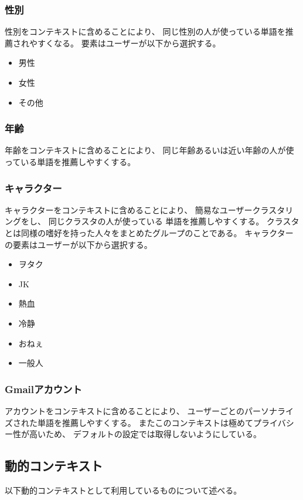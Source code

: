 \subsubsection{性別}
性別をコンテキストに含めることにより、
同じ性別の人が使っている単語を推薦されやすくなる。
要素はユーザーが以下から選択する。
\begin{itemize}
  \item 男性
  \item 女性
  \item その他
\end{itemize}

\subsubsection{年齢}
年齢をコンテキストに含めることにより、
同じ年齢あるいは近い年齢の人が使っている単語を推薦しやすくする。

\subsubsection{キャラクター}
キャラクターをコンテキストに含めることにより、
簡易なユーザークラスタリングをし、
同じクラスタの人が使っている
単語を推薦しやすくする。
クラスタとは同様の嗜好を持った人々をまとめたグループのことである。
キャラクターの要素はユーザーが以下から選択する。
\begin{itemize}
  \item ヲタク
  \item JK
  \item 熱血
  \item 冷静
  \item おねぇ
  \item 一般人
\end{itemize}

\subsubsection{Gmailアカウント}
アカウントをコンテキストに含めることにより、
ユーザーごとのパーソナライズされた単語を推薦しやすくする。
またこのコンテキストは極めてプライバシー性が高いため、
デフォルトの設定では取得しないようにしている。

\subsection{動的コンテキスト}
\label{dynamiccontext}
以下動的コンテキストとして利用しているものについて述べる。

